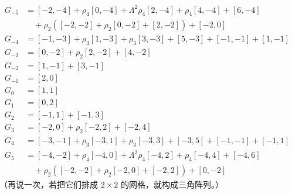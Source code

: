 %
\begin{equation}
\begin{split}
G_{-5}& = [ -2,-4] + \rho_4 [0,-4] + \Lambda^2 \rho_4 [2,-4] + \rho_4 [4,-4] + [ 6,-4] \\
&\quad + \rho_2 ( [-2,-2] + \rho_2 [0,-2]+[2,-2]) + [-2,0]\\
G_{-4}& = [-1,-3] + \rho_3 [1,-3] + \rho_3 [3,-3] + [5,-3] + [-1,-1] + [1,-1] \\
G_{-3} & = [0,-2] + \rho_2 [2,-2] + [4,-2] \\
G_{-2} & = [1,-1] + [3,-1] \\
G_{-1} & = [2,0] \\
G_{0} & = [1,1] \\
G_1 & = [0,2] \\
G_2 & = [-1,1] + [-1,3] \\
G_3 & = [-2,0] + \rho_2 [-2,2] + [-2,4] \\
G_4 & = [-3,-1] + \rho_3 [-3,1] + \rho_3 [-3,3] + [-3,5] + [-1,-1] + [-1,1] \\
G_5 & = [-4,-2] + \rho_4 [-4,0] + \Lambda^2 \rho_4 [-4,2] + \rho_4 [-4,4] + [-4,6] \\
&\quad + \rho_2 ( [-2,-2] + \rho_2 [-2,0]+[-2,2]) + [0,-2]
\end{split}
\end{equation}
%
（再说一次，若把它们排成 $2\times 2$ 的网格，就构成三角阵列。）



